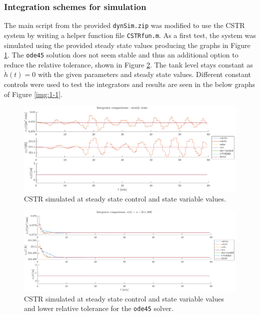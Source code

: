 \documentclass[letterpaper,12pt]{article}
\begin{document}
\subsubsection*{Integration schemes for simulation}
The main script from the provided \texttt{dynSim.zip} was modified to use the CSTR system by writing a helper function file \texttt{CSTRfun.m}. As a first test, the system was simulated using the provided steady state values producing the graphs in Figure \ref{img:1-ss}. The \texttt{ode45} solution does not seem stable and thus an additional option to reduce the relative tolerance, shown in Figure \ref{img:1-ss-reltol}. The tank level stays constant as $\dot{h}(t) = 0$ with the given parameters and steady state values. Different constant controls were used to test the integrators and results are seen in the below graphs of Figure \ref{img:1-1}.

\begin{figure}[!htbp]
	\centering
	\includegraphics[width=1\textwidth]{img/1-ss.png}
	\caption{CSTR simulated at steady state control and state variable values.}
	\label{img:1-ss}
\end{figure}
\begin{figure}[!htbp]
	\centering
	\includegraphics[width=1\textwidth]{img/1-ss-reltol.png}
	\caption{CSTR simulated at steady state control and state variable values and lower relative tolerance for the \texttt{ode45} solver.}
	\label{img:1-ss-reltol}
\end{figure}
\end{document}
